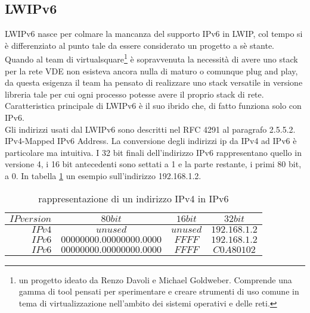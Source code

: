 \subsection{LWIPv6}
LWIPv6\cite{K6} nasce per colmare la mancanza del supporto IPv6 in LWIP, col tempo si \`e differenziato al punto tale da essere considerato un progetto a s\`e stante.\\
Quando al team di virtualsquare\footnote{un progetto ideato da Renzo Davoli e Michael Goldweber. Comprende una gamma di tool pensati per sperimentare e creare strumenti di uso comune in tema di virtualizzazione nell'ambito dei sistemi operativi e delle reti.}\cite{K15} \`e sopravvenuta la necessit\`a di avere uno stack per la rete VDE non esisteva ancora nulla di maturo o comunque plug and play, da questa esigenza il team ha pensato di realizzare uno stack versatile in versione libreria tale per cui ogni processo potesse avere il proprio stack di rete.\\
Caratteristica principale di LWIPv6 \`e il suo  ibrido che, di fatto funziona solo con IPv6. \\
Gli indirizzi usati dal LWIPv6 sono descritti nel RFC 4291\cite{K17} al paragrafo 2.5.5.2. IPv4-Mapped IPv6 Address.
La conversione degli indirizzi ip da IPv4 ad IPv6 \`e particolare ma intuitiva. I 32 bit finali dell'indirizzo IPv6 rappresentano quello in versione 4, i 16 bit antecedenti sono settati a 1 e la parte restante, i primi 80 bit, a 0. In tabella \ref{tab:IPv4toIPv6} un esempio sull'indirizzo 192.168.1.2.
\begin{table}[h]                        %
\begin{center}                          %
\begin{tabular}{r|c|c|c}                  %
\hline
$IP version$ & $80 bit$ & $16 bit$ & $32 bit$\\
\hline \hline                         %
$IPv4$ & $unused$  & $unused$  & $192.168.1.2$\\           %
\hline                                  %
$IPv6$ & $00000000.00000000.0000$ & $FFFF$ & $192.168.1.2$\\           %
\hline                                  %
$IPv6$ & $00000000.00000000.0000$ & $FFFF$ & $C0A80102$\\
\hline                           %
\end{tabular}
\caption[IPv4 to IPv6 conversion]{rappresentazione di un indirizzo IPv4 in IPv6}\label{tab:IPv4toIPv6}
\end{center}
\end{table}

